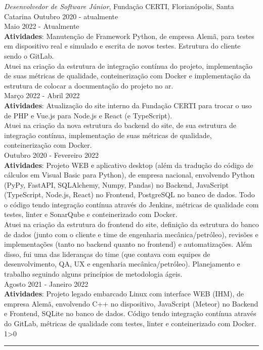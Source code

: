 \documentclass[a4paper,10pt]{article}
\newcommand{\criaSecao}[4][0]{
	\begin{tcolorbox}[
        blanker,
        breakable,
        title=\begin{minipage}{0.16\linewidth}\large{\textbf{#2}}\vspace{-#3\baselineskip}\end{minipage},
        coltitle=black,
        leftupper=0.21\linewidth,
    ]
        #4
		\ifnum0#1>0 { \hrule {\ } } \fi
    \end{tcolorbox}
}
\begin{document}
    \criaSecao[1]{Experiência}{2}{
        \textit{Desenvolvedor de Software Júnior}, Fundação CERTI, Florianópolis, Santa Catarina \hfill Outubro 2020 - atualmente \\
        Maio 2022 - Atualmente\\
        \textbf{Atividades}: Manutenção de Framework Python, de empresa Alemã, para testes em dispositivo real e simulado e escrita de novos testes. Estrutura do cliente sendo o GitLab.\\

        Atuei na criação da estrutura de integração contínua do projeto, implementação de suas métricas de qualidade, conteinerização com Docker e implementação da estrutura de colocar a documentação do projeto no ar.\\

        Março 2022 -  Abril 2022\\
        \textbf{Atividades}: Atualização do site interno da Fundação CERTI para trocar o uso de PHP e Vue.js para Node.js e React (e TypeScript).\\

        Atuei na criação da nova estrutura do backend do site, de sua estrutura de integração contínua, implementação de suas métricas de qualidade, conteinerização com Docker.\\

        Outubro 2020 - Fevereiro 2022\\
        \textbf{Atividades}: Projeto WEB e aplicativo desktop (além da tradução do código de cálculos em Visual Basic para Python), de empresa nacional, envolvendo Python (PyPy, FastAPI, SQLAlchemy, Numpy, Pandas) no Backend, JavaScript (TypeScript, Node.js, React) no Frontend, PostgreSQL no banco de dados. Todo o código tendo integração contínua através do Jenkins, métricas de qualidade com testes, linter e SonarQube e conteinerizado com Docker.\\

        Atuei na criação da estrutura do frontend do site, definição da estrutura do banco de dados (junto com o cliente e time de engenharia mecânica/petróleo), revisões e implementações (tanto no backend quanto no frontend) e automatizações. Além disso, fui uma das lideranças do time (que contava com equipes de desenvolvimento, QA, UX e engenharia mecânica/petróleo). Planejamento e trabalho seguindo alguns princípios de metodologia ágeis.\\

        Agosto 2021 - Janeiro 2022\\
        \textbf{Atividades}: Projeto legado embarcado Linux com interface WEB (IHM), de empresa Alemã, envolvendo C++ no dispositivo, JavaScript (Meteor) no Backend e Frontend, SQLite no banco de dados. Código tendo integração contínua através do GitLab, métricas de qualidade com testes, linter e conteinerizado com Docker.\\

}
\end{document}
